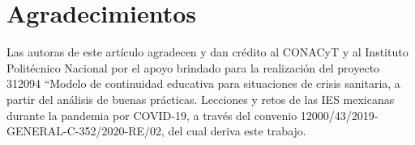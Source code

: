 \documentclass{textolivre}
\begin{document}
\section*{Agradecimientos}
Las autoras de este artículo agradecen y dan crédito al CONACyT y al Instituto Politécnico Nacional por el apoyo brindado para la realización del proyecto 312094 “Modelo de continuidad educativa para situaciones de crisis sanitaria, a partir del análisis de buenas prácticas. Lecciones y retos de las IES mexicanas durante la pandemia por COVID-19, a través del convenio 12000/43/2019-GENERAL-C-352/2020-RE/02, del cual deriva este trabajo.


\printbibliography\label{sec-bib}
\end{document}
